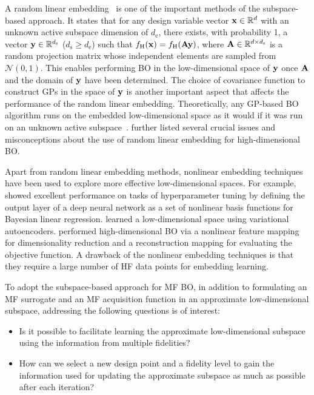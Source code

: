 \documentclass[journal ]{new-aiaa}
\begin{document}
A random linear embedding~\citep{WangZ2016} is one of the important methods of the subspace-based approach.
It states that for any design variable vector ${\bf x} \in \mathbb{R}^d$ with an unknown active subspace dimension of $d_\text{e}$, there exists, with probability 1, a vector ${\bf y} \in \mathbb{R}^{d_\text{s}}$ ($d_\text{s} \geq d_\text{e}$) such that $f_\text{H}({\bf x}) = f_\text{H}({\bf Ay})$, where ${\bf A} \in \mathbb{R}^{d \times d_\text{s}}$ is a random projection matrix whose independent elements are sampled from $\mathcal{N}(0,1)$.
This enables performing BO in the low-dimensional space of ${\bf y}$ once ${\bf A}$ and the domain of ${\bf y}$ have been determined.
The choice of covariance function to construct GPs in the space of ${\bf y}$ is another important aspect that affects the performance of the random linear embedding. 
Theoretically, any GP-based BO algorithm runs on the embedded low-dimensional space as it would if it was run on an unknown active subspace~\citep{Nayebi2019}.
\citet{Letham2020} further listed several crucial issues and misconceptions about the use of random linear embedding for high-dimensional BO.

Apart from random linear embedding methods, nonlinear embedding techniques have been used to explore more effective low-dimensional spaces.
For example, \citet{Snoek2015} showed excellent performance on tasks of hyperparameter tuning by defining the output layer of a deep neural network as a set of nonlinear basis functions for Bayesian linear regression.
\citet{GomezBombarelli2018} learned a low-dimensional space using variational autoencoders.
\citet{Moriconi2020} performed high-dimensional BO via a nonlinear feature mapping for dimensionality reduction and a reconstruction mapping for evaluating the objective function. 
A drawback of the nonlinear embedding techniques is that they require a large number of HF data points for embedding learning.

To adopt the subspace-based approach for MF BO, in addition to formulating an MF surrogate and an MF acquisition function in an approximate low-dimensional subspace, addressing the following questions is of interest: 
\begin{itemize}
	\item Is it possible to facilitate learning the approximate low-dimensional subspace using the information from multiple fidelities?
	
	\item How can we select a new design point and a fidelity level to gain the information used for updating the approximate subspace as much as possible after each iteration?
\end{itemize}
\end{document}
